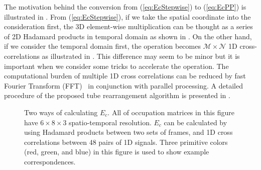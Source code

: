 \documentclass[11pt]{hyu_thesis}
\begin{document}
The motivation behind the conversion from (\ref{eq:EcStepwise}) to (\ref{eq:EcPP}) is illustrated in . From (\ref{eq:EcStepwise}), if we take the spatial coordinate into the consideration first, the 3D element-wise multiplication can be thought as a series of 2D Hadamard products in temporal domain as shown in . On the other hand, if we consider the temporal domain first, the operation becomes $\mathcal{M} \times \mathcal{N}$ 1D cross-correlations as illustrated in . This difference may seem to be minor but it is important when we consider some tricks to accelerate the operation. The computational burden of multiple 1D cross correlations can be reduced by fast Fourier Transform (FFT)~\cite{Oppenheim2009} in conjunction with parallel processing. A detailed procedure of the proposed tube rearrangement algorithm is presented in .
\begin{figure}
	\centering
	\qquad
	\caption{Two ways of calculating $E_c$. All of occupation matrices in this figure have $6 \times 8 \times 3$ spatio-temporal resolution. $E_c$ can be calculated by using \protect{} Hadamard products between two sets of frames, and \protect{} 1D cross correlations between 48 pairs of 1D signals. Three primitive colors (red, green, and blue) in this figure is used to show example correspondences.}
	\label{fig:Ec_motivation}
\end{figure}
\end{document}

